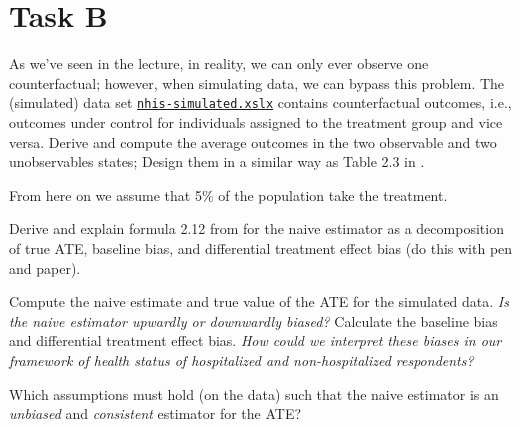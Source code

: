 \section*{Task B}

\begin{boenumerate}
  \item As we've seen in the lecture, in reality, we can only ever observe one counterfactual; however, when simulating data, we can bypass this problem. The (simulated) data set  \href{https://github.com/HumanCapitalAnalysis/microeconometrics/tree/master/problem-sets/01-potential-outcome-model/data}{\texttt{nhis-simulated.xslx}} contains counterfactual outcomes, i.e., outcomes under control for individuals assigned to the treatment group and vice versa. Derive and compute the average outcomes in the two observable and two unobservables states; Design them in a similar way as Table 2.3 in \cite{Morgan.2014}.

\end{boenumerate}

\noindent From here on we assume that 5$\%$ of the population take the treatment.

\begin{boenumerate}\setcounter{enumi}{1}

\item Derive and explain formula 2.12 from \cite{Morgan.2014} for the naive estimator as a decomposition of true ATE, baseline bias, and differential treatment effect bias (do this with pen and paper).

\item Compute the naive estimate and true value of the ATE for the simulated data. \emph{Is the naive estimator upwardly or downwardly biased?} Calculate the baseline bias and differential treatment effect bias. \emph{How could we interpret these biases in our framework of health status of hospitalized and  non-hospitalized respondents?}

\item Which assumptions must hold (on the data) such that the naive estimator is an \emph{unbiased} and \emph{consistent} estimator for the ATE?

\end{boenumerate}

\nocite{Angrist.2008}
\nocite{NHIS}





